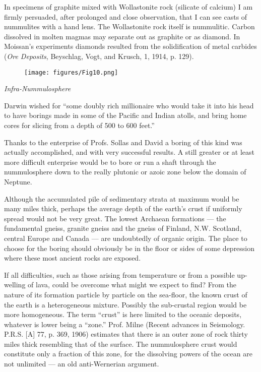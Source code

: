\documentclass[a4paper, 12pt, oneside]{article}
\begin{document}
In specimens of graphite mixed with Wollastonite rock (silicate of calcium) I am firmly persuaded, after prolonged and close observation, that I can see casts of nummulites with a hand lens. The Wollastonite rock itself is nummulitic. Carbon dissolved in molten magmas may separate out as graphite or as diamond. In Moissan's experiments diamonds resulted from the solidification of metal carbides (\emph{Ore Deposits}, Beyschlag, Vogt, and Krusch, 1, 1914, p. 129).
\begin{figure}[H]
\centering
\texttt{[image: figures/Fig10.png]}
\caption*{}
\end{figure}
\bigskip
\centerline{\emph{Infra-Nummulosphere}}

Darwin wished for ``some doubly rich millionaire who would take it into his head to have borings made in some of the Pacific and Indian atolls, and bring home cores for slicing from a depth of 500 to 600 feet.''

Thanks to the enterprise of Profs. Sollas and David a boring of this kind was actually accomplished, and with very successful results. A still greater or at least more difficult enterprise would be to bore or run a shaft through the nummulosphere down to the really plutonic or azoic zone below the domain of Neptune.

Although the accumulated pile of sedimentary strata at maximum would be many miles thick, perhaps the average depth of the earth's crust if uniformly spread would not be very great. The lowest Archaean formations --- the fundamental gneiss, granite gneiss and the gneiss of Finland, N.W. Scotland, central Europe and Canada --- are undoubtedly of organic origin. The place to choose for the boring should obviously be in the floor or sides of some depression where these most ancient rocks are exposed.

If all difficulties, such as those arising from temperature or from a possible up-welling of lava, could be overcome what might we expect to find? From the nature of its formation particle by particle on the sea-floor, the known crust of the earth is a heterogeneous mixture. Possibly the sub-crustal region would be more homogeneous. The term ``crust'' is here limited to the oceanic deposits, whatever is lower being a ``zone.'' Prof. Milne (Recent advances in Seismology. P.R.S. [A] 77, p. 369, 1906) estimates that there is an outer zone of rock thirty miles thick resembling that of the surface. The nummulosphere crust would constitute only a fraction of this zone, for the dissolving powers of the ocean are not unlimited --- an old anti-Wernerian argument.
\end{document}
